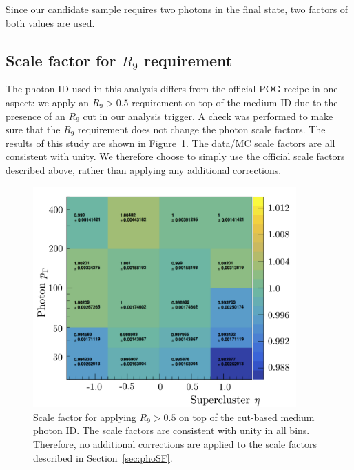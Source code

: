 Since our candidate sample requires two photons in the final state,
two factors of both values are used.


\subsection{Scale factor for $R_9$ requirement}
\label{sec:R9SF}
The photon ID used in this analysis differs from the official POG recipe in one aspect: we apply an $R_9 > 0.5$ requirement on top of the medium ID due to the presence of an $R_9$ cut in our analysis trigger. A check was performed to make sure that the $R_9$ requirement does not change the photon scale factors. The results of this study are shown in Figure~\ref{fig:R9SF}. The data/MC scale factors are all consistent with unity. We therefore choose to simply use the official scale factors described above, rather than applying any additional corrections.

\begin{figure}[htbp]
    \centering
    \includegraphics[width=0.9\textwidth]{Figures/EventSelect/R9SF.pdf}
    \caption{Scale factor for applying $R_9 > 0.5$ on top of the cut-based medium photon ID.
    The scale factors are consistent with unity in all bins. Therefore, no additional corrections are applied to
    the scale factors described in Section~\ref{sec:phoSF}.}
    \label{fig:R9SF}
\end{figure}


